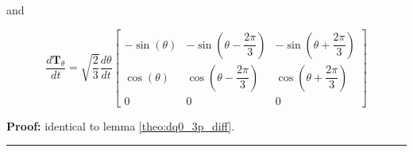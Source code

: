 \begin{lemma}
	and

\begin{equation}
        \dfrac{d\mathbf{T}_\theta }{dt} =
\sqrt{\dfrac{2}{3}}\dfrac{d\theta}{dt}
\left[\begin{array}{ccc}
         -\sin\left(\theta\right)                    & -\sin\left(\theta - \dfrac{2\pi}{3} \right) & -\sin\left(\theta + \dfrac{2\pi}{3}\right) \\[5mm]
          \cos\left(\theta\right)                    &  \cos\left(\theta - \dfrac{2\pi}{3} \right) &  \cos\left(\theta + \dfrac{2\pi}{3}\right) \\[5mm]
          0                                          &  0                                          & 0
\end{array}\right]
\end{equation}
\end{lemma}
\textbf{Proof:} identical to lemma \ref{theo:dq0_3p_diff}.
\vspace{5mm}
\hrule
\vspace{5mm}

